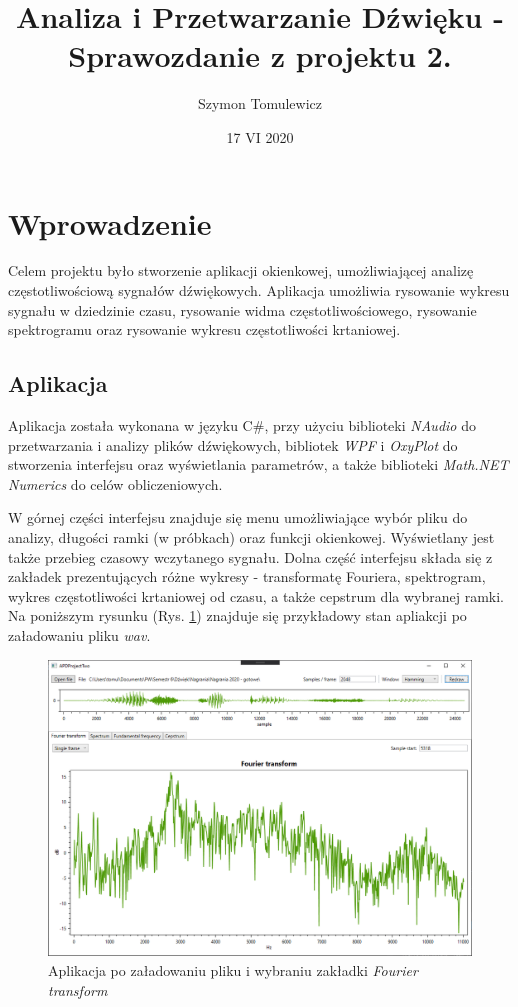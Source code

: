 \documentclass[12pt,a4paper]{article}
\begin{document}
\title{Analiza i Przetwarzanie Dźwięku - Sprawozdanie z projektu 2.}
\author{Szymon Tomulewicz}
\date{17 VI 2020}
\maketitle
\tableofcontents
\newpage

\section{Wprowadzenie\label{sec:wprowadzenie}}
    Celem projektu było stworzenie aplikacji okienkowej, umożliwiającej analizę częstotliwościową sygnałów dźwiękowych. Aplikacja umożliwia rysowanie wykresu sygnału w dziedzinie czasu, rysowanie widma częstotliwościowego, rysowanie spektrogramu oraz rysowanie wykresu częstotliwości krtaniowej.

    \subsection{Aplikacja\label{sec:aplikacja}}
        Aplikacja została wykonana w języku C\#, przy użyciu biblioteki \emph{NAudio} do przetwarzania i analizy plików dźwiękowych, bibliotek \emph{WPF} i \emph{OxyPlot} do stworzenia interfejsu oraz wyświetlania parametrów, a także biblioteki \emph{Math.NET Numerics} do celów obliczeniowych.

        W górnej części interfejsu znajduje się menu umożliwiające wybór pliku do analizy, długości ramki (w próbkach) oraz funkcji okienkowej. Wyświetlany jest także przebieg czasowy wczytanego sygnału. Dolna część interfejsu składa się z zakładek prezentujących różne wykresy - transformatę Fouriera, spektrogram, wykres częstotliwości krtaniowej od czasu, a także cepstrum dla wybranej ramki. Na poniższym rysunku (Rys. \ref{fig:app}) znajduje się przykładowy stan apliakcji po załadowaniu pliku \emph{wav}.

        \begin{figure}[h!]
            \centering
            \includegraphics[width=1.0\textwidth]{figures/201_bla_widmo.png}
            \caption{Aplikacja po załadowaniu pliku i wybraniu zakładki \emph{Fourier transform}}
            \label{fig:app}
        \end{figure}
\end{document}
